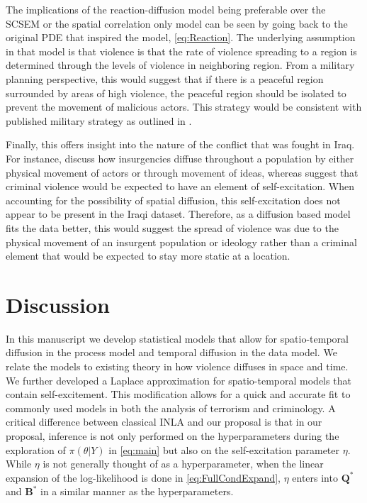 \documentclass[11pt]{isuthesis}
\begin{document}
The implications of the reaction-diffusion model being preferable over the SCSEM or the spatial correlation only model can be seen by going back to the original PDE that inspired the model, \eqref{eq:Reaction}.  The underlying assumption in that model is that violence is that the rate of violence spreading to a region is determined through the levels of violence in neighboring region.  From a military planning perspective, this would suggest that if there is a peaceful region surrounded by areas of high violence, the peaceful region should be isolated to prevent the movement of malicious actors.  This strategy would be consistent with published military strategy as outlined in \cite{army2006counterinsurgency}.


Finally, this offers insight into the nature of the conflict that was fought in Iraq.  For instance, \cite{zhukov2012roads} discuss how insurgencies diffuse throughout a population by either physical movement of actors or through movement of ideas, whereas \cite{short2008statistical} suggest that criminal violence would be expected to have an element of self-excitation.  When accounting for the possibility of spatial diffusion, this self-excitation does not appear to be present in the Iraqi dataset. Therefore, as a diffusion based model fits the data better, this would suggest the spread of violence was due to the physical movement of an insurgent population or ideology rather than a criminal element that would be expected to stay more static at a location.




\section{Discussion}

In this manuscript we develop statistical models that allow for spatio-temporal diffusion in the process model and temporal diffusion in the data model.  We relate the models to existing theory in how violence diffuses in space and time.  We further developed a Laplace approximation for spatio-temporal models that contain self-excitement.  This modification allows for a quick and accurate fit to commonly used models in both the analysis of terrorism and criminology. A critical difference between classical INLA and our proposal is that in our proposal, inference is not only performed on the hyperparameters during the exploration of $\pi(\theta|Y)$ in \eqref{eq:main} but also on the self-excitation parameter $\eta$.  While $\eta$ is not generally thought of as a hyperparameter, when the linear expansion of the log-likelihood is done in \eqref{eq:FullCondExpand}, $\eta$ enters into $\boldsymbol{Q^*}$ and $\boldsymbol{B^*}$ in a similar manner as the hyperparameters. 
\end{document}
